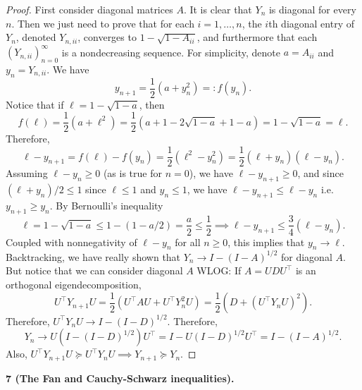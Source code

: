 \documentclass[../borwein-lewis_notes.tex]{subfiles}
\begin{document}
\begin{proof}
First consider diagonal matrices $A$. It is clear that $Y_n$ is 
diagonal for every $n$. Then we just need to prove that for each 
$i=1,\ldots,n$, the $i$th diagonal entry of $Y_n$, denoted $Y_{n,ii}$,
 converges to $1-\sqrt{1-A_{ii}}$, and furthermore that each 
$(Y_{n,ii})_{n=0}^\infty$ is a nondecreasing sequence. For simplicity,
denote $a=A_{ii}$ and $y_n = Y_{n,ii}$. We have 
\begin{equation*}
y_{n+1} = \frac{1}{2}(a+y_n^2) =: f(y_n).
\end{equation*}
Notice that if $\ell = 1-\sqrt{1-a}$, then 
\begin{equation*}
f(\ell)=\frac{1}{2}(a+\ell^2) = \frac{1}{2}(a + 1-2\sqrt{1-a} + 1-a)
= 1-\sqrt{1-a}=\ell.
\end{equation*}
Therefore, 
\begin{equation*}
\ell - y_{n+1} = f(\ell)-f(y_n) = \frac{1}{2}(\ell^2 - y_n^2)
= \frac{1}{2}(\ell+y_n)(\ell-y_n).
\end{equation*}
Assuming $\ell-y_n \geq 0$ (as is true for $n=0$), we have $\ell-y_{n+1}
\geq 0$, and since $(\ell+y_n)/2 \leq 1$ since $\ell\leq 1$ and 
$y_n\leq 1$, we have $\ell - y_{n+1} \leq \ell- y_n$ i.e. 
$y_{n+1}\geq y_n$. By Bernoulli's inequality
\begin{equation*}
\ell = 1-\sqrt{1-a} \leq 1-(1-a/2) = \frac{a}{2} \leq \frac{1}{2}
\implies \ell-y_{n+1}\leq \frac{3}{4}(\ell - y_n).
\end{equation*}
Coupled with nonnegativity of $\ell-y_n$ for all $n\geq 0$, this 
implies that $y_n \to \ell$. \\
Backtracking, we have really shown that $Y_n\to I-(I-A)^{1/2}$ for 
diagonal $A$. But notice that we can consider diagonal $A$ WLOG:
If $A=UDU^\top$ is an orthogonal eigendecomposition, 
\begin{equation*}
U^\top Y_{n+1} U = \frac{1}{2}(U^\top A U + U^\top Y_n^2 U)
= \frac{1}{2}(D + (U^\top Y_n U)^2).
\end{equation*}
Therefore, $U^\top Y_n U \to I-(I-D)^{1/2}$. Therefore, 
\begin{equation*}
Y_n \to U(I-(I-D)^{1/2})U^\top = I - U(I-D)^{1/2}U^\top = I - (I-A)^{1/2}.
\end{equation*}
Also, $U^\top Y_{n+1}U\succeq U^\top Y_n U \implies Y_{n+1}\succeq 
Y_n$.
\end{proof}\noindent
\textbf{7 (The Fan and Cauchy-Schwarz inequalities).}
\end{document}
